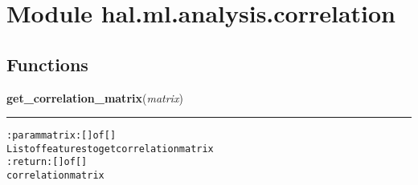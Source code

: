 %
%
%


\section{Module hal.ml.analysis.correlation}

    \label{hal:ml:analysis:correlation}


  \subsection{Functions}

    \label{hal:ml:analysis:correlation:get_correlation_matrix}

    \vspace{0.5ex}

\hspace{.8\funcindent}\begin{boxedminipage}{\funcwidth}

    \raggedright \textbf{get\_correlation\_matrix}(\textit{matrix})

    \vspace{-1.5ex}

    \rule{\textwidth}{0.5\fboxrule}
\setlength{\parskip}{2ex}
\begin{alltt}

:param matrix: [] of []
    List of features to get correlation matrix
:return: [] of []
    correlation matrix
\end{alltt}

\setlength{\parskip}{1ex}
    \end{boxedminipage}

